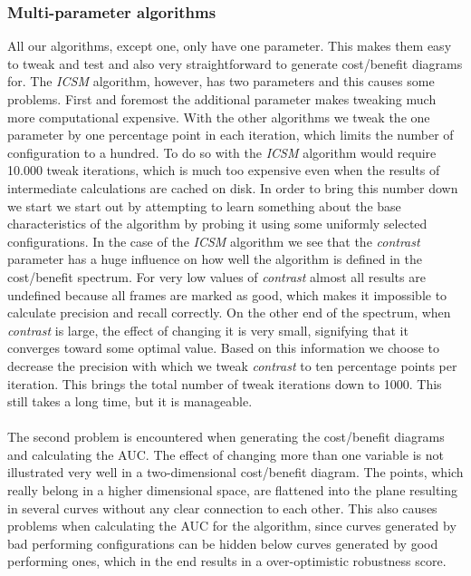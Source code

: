 \documentclass[12pt]{article}
\begin{document}
\subsubsection{Multi-parameter algorithms} \label{sec:ph1multiparameter}
%
All our algorithms, except one, only have one parameter. This makes them easy to tweak and test and also very straightforward to generate cost/benefit diagrams for. The \textit{ICSM} algorithm, however, has two parameters and this causes some problems. First and foremost the additional parameter makes tweaking much more computational expensive. With the other algorithms we tweak the one parameter by one percentage point in each iteration, which limits the number of configuration to a hundred. To do so with the \textit{ICSM} algorithm would require 10.000 tweak iterations, which is much too expensive even when the results of intermediate calculations are cached on disk. In order to bring this number down we start we start out by attempting to learn something about the base characteristics of the algorithm by probing it using some uniformly selected configurations. In the case of the \textit{ICSM} algorithm we see that the \textit{contrast} parameter has a huge influence on how well the algorithm is defined in the cost/benefit spectrum. For very low values of \textit{contrast} almost all results are undefined because all frames are marked as good, which makes it impossible to calculate precision and recall correctly. On the other end of the spectrum, when \textit{contrast} is large, the effect of changing it is very small, signifying that it converges toward some optimal value. Based on this information we choose to decrease the precision with which we tweak \textit{contrast} to ten percentage points per iteration. This brings the total number of tweak iterations down to 1000. This still takes a long time, but it is manageable.\\
\\
The second problem is encountered when generating the cost/benefit diagrams and calculating the AUC. The effect of changing more than one variable is not illustrated very well in a two-dimensional cost/benefit diagram. The points, which really belong in a higher dimensional space, are flattened into the plane resulting in several curves without any clear connection to each other. This also causes problems when calculating the AUC for the algorithm, since curves generated by bad performing configurations can be hidden below curves generated by good performing ones, which in the end results in a over-optimistic robustness score.
\end{document}
